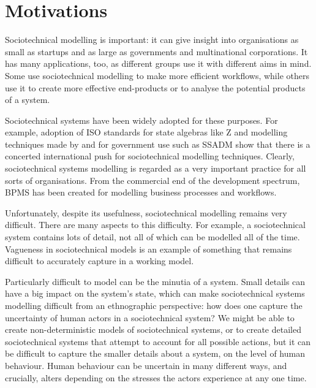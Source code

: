 \chapter{Motivations}
\label{motivations}
Sociotechnical modelling is important: it can give insight into organisations as small as startups and as large as governments and multinational corporations. It has many applications, too, as different groups use it with different aims in mind. Some use sociotechnical modelling to make more efficient workflows\cite{Aalst2002}, while others use it to create more effective end-products or to analyse the potential products of a system. \par

Sociotechnical systems have been widely adopted for these purposes. For example, adoption of ISO standards for state algebras like Z\cite{ZStandardsPanel2000} and modelling techniques made by and for government use such as SSADM show that there is a concerted international push for sociotechnical modelling techniques. Clearly, sociotechnical systems modelling is regarded as a very important practice for all sorts of organisations. From the commercial end of the development spectrum, BPMS has been created for modelling business processes and workflows\cite{bpmsSpec}. \par%

Unfortunately, despite its usefulness, sociotechnical modelling remains very difficult. There are many aspects to this difficulty. For example, a sociotechnical system contains lots of detail, not all of which can be modelled all of the time. Vagueness in sociotechnical models is an example of something that remains difficult to accurately capture in a working model\cite{Herrmann1999}.\par

Particularly difficult to model can be the minutia of a system. Small details can have a big impact on the system's state\cite{Crabtree2000}, which can make sociotechnical systems modelling difficult from an ethnographic perspective: how does one capture the uncertainty of human actors in a sociotechnical system? We might be able to create non-deterministic models of sociotechnical systems, or to create detailed sociotechnical systems that attempt to account for all possible actions, but it can be difficult to capture the smaller details about a system, on the level of human behaviour. Human behaviour can be uncertain in many different ways, and crucially, alters depending on the stresses the actors experience at any one time. \par

